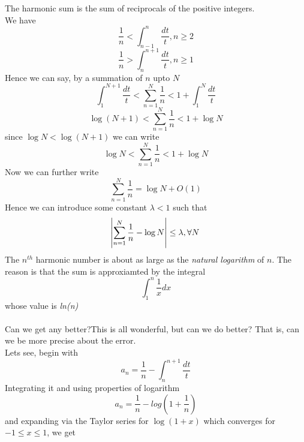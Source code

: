 \documentclass[2pt]{article}
\begin{document}
The harmonic sum is the sum of reciprocals of the positive integers.
\\
We have
\begin{equation}
\frac{1}{n} < \int_{n-1}^{n} \frac{dt}{t} , n \geq 2\nonumber
\end{equation}
\begin{equation}
\frac{1}{n} > \int_{n}^{n+1} \frac{dt}{t} , n \geq 1\nonumber
\end{equation}
Hence we can say, by a summation of $n$ upto $N$
\begin{equation}
\int_{1}^{N+1} \frac{dt}{t} < \sum_{n=1}^{N} \frac{1}{n} < 1 + \int_{1}^{N} \frac{dt}{t}\nonumber
\end{equation}
\begin{equation}
\log{(N+1)} < \sum_{n=1}^{N} \frac{1}{n} < 1 + \log{N}\nonumber
\end{equation}
since $\log{N} < \log{(N+1)}$ we can write\\
\begin{equation}
\log{N} < \sum_{n=1}^{N} \frac{1}{n} < 1 + \log{N}\nonumber
\end{equation}
Now we can further write
\begin{equation}
\sum_{n=1}^{N} \frac{1}{n} = \log{N} + O(1)\nonumber
\end{equation}
Hence we can introduce some constant $\lambda < 1$ such that
\begin{equation}
\abs{\sum_{n=1}^{N} \frac{1}{n} - \log{N}} \leq \lambda , \forall N\nonumber
\end{equation}
The $n^{th}$ harmonic number is about as large as the \emph{natural logarithm} of $n$. The reason is that the sum is approxiamted by the integral
\begin{equation}
\int_{1}^{n} \frac{1}{x} dx\nonumber
\end{equation}
whose value is \emph{ln(n)} \\
\\
Can we get any better?This is all wonderful, but can we do better? That is, can we be more precise about the
error. \\ Lets see, begin with
\begin{equation}
a_{n} = \frac{1}{n}-\int_{n}^{n+1}\frac{dt}{t} \nonumber
\end{equation}
Integrating it and using properties of logarithm
\begin{equation}
a_{n}=\frac{1}{n}-log{(1+\frac{1}{n})}
\end{equation}
and expanding via the Taylor series for $\log{(1 + x)}$ which converges for $-1 \leq x \leq 1$, we get
\end{document}
